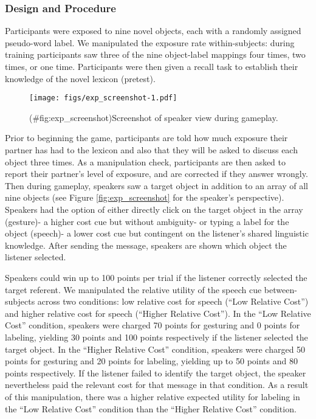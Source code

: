 \documentclass[english,,man,floatsintext]{apa6}
\begin{document}
\hypertarget{design-and-procedure}{%
\subsubsection{Design and Procedure}\label{design-and-procedure}}

Participants were exposed to nine novel objects, each with a randomly assigned pseudo-word label. We manipulated the exposure rate within-subjects: during training participants saw three of the nine object-label mappings four times, two times, or one time. Participants were then given a recall task to establish their knowledge of the novel lexicon (pretest).

\begin{figure}
\centering
\texttt{[image: figs/exp\_screenshot-1.pdf]}
\caption{(\#fig:exp\_screenshot)Screenshot of speaker view during gameplay.}
\end{figure}

Prior to beginning the game, participants are told how much exposure their partner has had to the lexicon and also that they will be asked to discuss each object three times. As a manipulation check, participants are then asked to report their partner's level of exposure, and are corrected if they answer wrongly. Then during gameplay, speakers saw a target object in addition to an array of all nine objects (see Figure \ref{fig:exp_screenshot} for the speaker's perspective). Speakers had the option of either directly click on the target object in the array (gesture)- a higher cost cue but without ambiguity- or typing a label for the object (speech)- a lower cost cue but contingent on the listener's shared linguistic knowledge. After sending the message, speakers are shown which object the listener selected.

Speakers could win up to 100 points per trial if the listener correctly selected the target referent. We manipulated the relative utility of the speech cue between-subjects across two conditions: low relative cost for speech (\enquote{Low Relative Cost}) and higher relative cost for speech (\enquote{Higher Relative Cost}). In the \enquote{Low Relative Cost} condition, speakers were charged 70 points for gesturing and 0 points for labeling, yielding 30 points and 100 points respectively if the listener selected the target object. In the \enquote{Higher Relative Cost} condition, speakers were charged 50 points for gesturing and 20 points for labeling, yielding up to 50 points and 80 points respectively. If the listener failed to identify the target object, the speaker nevertheless paid the relevant cost for that message in that condition. As a result of this manipulation, there was a higher relative expected utility for labeling in the \enquote{Low Relative Cost} condition than the \enquote{Higher Relative Cost} condition.
\end{document}
